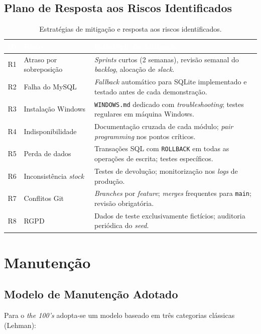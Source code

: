 \documentclass[11pt,a4paper]{report}
\begin{document}
\section{Plano de Resposta aos Riscos Identificados}

\begin{table}[H]
\centering\small
\begin{tabularx}{\textwidth}{c L{4cm} X}
\toprule
{}
\textbf{\textcolor{white}{ID}} &
\textbf{\textcolor{white}{Risco}} &
\textbf{\textcolor{white}{Estratégia de Mitigação}} \\
\midrule
R1 & Atraso por sobreposição & \textit{Sprints} curtos (2 semanas), revisão semanal do \textit{backlog}, alocação de \textit{slack}. \\
R2 & Falha do MySQL & \textit{Fallback} automático para SQLite implementado e testado antes de cada demonstração. \\
R3 & Instalação Windows & \texttt{WINDOWS.md} dedicado com \textit{troubleshooting}; testes regulares em máquina Windows. \\
R4 & Indisponibilidade & Documentação cruzada de cada módulo; \textit{pair programming} nos pontos críticos. \\
R5 & Perda de dados & Transações SQL com \texttt{ROLLBACK} em todas as operações de escrita; testes específicos. \\
R6 & Inconsistência \textit{stock} & Testes de devolução; monitorização nos \textit{logs} de produção. \\
R7 & Conflitos Git & \textit{Branches} por \textit{feature}; \textit{merges} frequentes para \texttt{main}; revisão obrigatória. \\
R8 & RGPD & Dados de teste exclusivamente fictícios; auditoria periódica do \textit{seed}. \\
\bottomrule
\end{tabularx}
\caption{Estratégias de mitigação e resposta aos riscos identificados.}
\label{tab:mitigacao}
\end{table}

\chapter{Manutenção}\label{cap:manutencao}

\section{Modelo de Manutenção Adotado}
Para o \textit{the 100's} adopta-se um modelo baseado em três categorias clássicas (Lehman):
\end{document}
